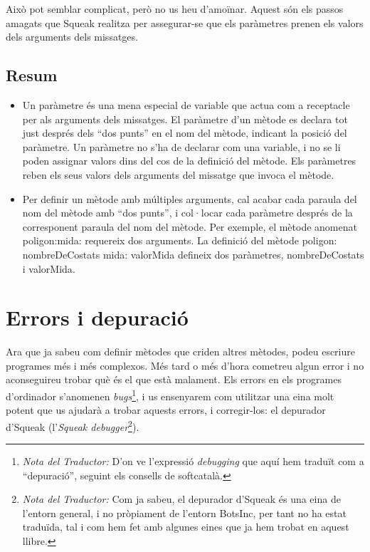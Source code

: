 Això pot semblar complicat, però no us heu d'amoïnar. Aquest són els passos amagats que Squeak realitza per assegurar-se que els paràmetres prenen els valors dels arguments dels missatges. 

\section{Resum}
\begin{itemize}
\item Un paràmetre és una mena especial de variable que actua com a receptacle per als arguments dels missatges. El paràmetre d'un mètode es declara tot just després dels ``dos punts'' en el nom del mètode, indicant la posició del paràmetre. Un paràmetre no s'ha de declarar com una variable, i no se li poden assignar valors dins del cos de la definició del mètode. Els paràmetres reben els seus valors dels arguments del missatge que invoca el mètode.
\item Per definir un mètode amb múltiples arguments, cal acabar cada paraula del nom del mètode amb ``dos punts'', i col·locar cada paràmetre després de la corresponent paraula del nom del mètode. Per exemple, el mètode anomenat \textsf{poligon:mida:} requereix dos arguments. La definició del mètode \textsf{poligon: nombreDeCostats mida: valorMida} defineix dos paràmetres, \textsf{nombreDeCostats} i \textsf{valorMida}.
\end{itemize}

\chapter{Errors i depuració} 
\label{cap15}

Ara que ja sabeu com definir mètodes que criden altres mètodes, podeu escriure programes més i més complexos. Més tard o més d'hora cometreu algun error i no aconseguireu trobar què és el que està malament.
Els errors en els programes d'ordinador s'anomenen \emph{bugs}\footnote{\emph{Nota del Traductor:} D'on ve l'expressió \emph{debugging} que aquí hem traduït com a ``depuració'', seguint els consells de softcatalà.}, i us ensenyarem com utilitzar una eina molt potent que us ajudarà a trobar aquests errors, i corregir-los: el depurador d'Squeak (l'\emph{Squeak debugger}\footnote{\emph{Nota del Traductor:} Com ja sabeu, el depurador d'Squeak és una eina de l'entorn general, i no pròpiament de l'entorn BotsInc, per tant no ha estat traduïda, 
tal i com hem fet amb algunes eines que ja hem trobat en aquest llibre.}).

